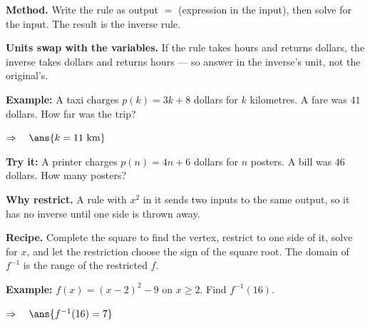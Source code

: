 \documentclass[12pt]{article}
\begin{document}


\begin{formulabox}
\textbf{Method.} Write the rule as output $=$ (expression in the input), then solve for the input. The result is the inverse rule.\par
\textbf{Units swap with the variables.} If the rule takes hours and returns dollars, the inverse takes dollars and returns hours --- so answer in the inverse's unit, not the original's.
\end{formulabox}

\begin{examplebox}
\textbf{Example:} \quad A taxi charges $p(k) = 3k + 8$ dollars for $k$ kilometres. A fare was $41$ dollars. How far was the trip?

$\Rightarrow\quad \ans{k = 11 \text{ km}}$
\end{examplebox}

\begin{tryitbox}
\textbf{Try it:} \quad A printer charges $p(n) = 4n + 6$ dollars for $n$ posters. A bill was $46$ dollars. How many posters?\\[2pt]
\end{tryitbox}


\begin{formulabox}
\textbf{Why restrict.} A rule with $x^{2}$ in it sends two inputs to the same output, so it has no inverse until one side is thrown away.\par
\textbf{Recipe.} Complete the square to find the vertex, restrict to one side of it, solve for $x$, and let the restriction choose the sign of the square root. The domain of $f^{-1}$ is the range of the restricted $f$.
\end{formulabox}

\begin{examplebox}
\textbf{Example:} \quad $f(x) = (x-2)^{2} - 9$ on $x \geq 2$. Find $f^{-1}(16)$.

$\Rightarrow\quad \ans{f^{-1}(16) = 7}$
\end{examplebox}
\end{document}

